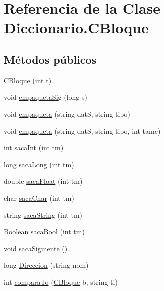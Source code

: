 \hypertarget{class_diccionario_1_1_c_bloque}{\section{Referencia de la Clase Diccionario.\-C\-Bloque}
\label{class_diccionario_1_1_c_bloque}
}
\subsection*{Métodos públicos}
\begin{DoxyCompactItemize}
\item 
\hyperlink{class_diccionario_1_1_c_bloque_a38a4b7e9ac45c68a4f856c910460f60b}{C\-Bloque} (int t)
\item 
void \hyperlink{class_diccionario_1_1_c_bloque_aa1a4c1a908e3145c81f0d39a864a1a2a}{empaqueta\-Sig} (long s)
\item 
void \hyperlink{class_diccionario_1_1_c_bloque_a74309dc130ed48a37b84290667936914}{empaqueta} (string dat\-S, string tipo)
\item 
void \hyperlink{class_diccionario_1_1_c_bloque_a71e65edd630045806410020be0f1ded5}{empaqueta} (string dat\-S, string tipo, int tamc)
\item 
int \hyperlink{class_diccionario_1_1_c_bloque_a6ab751791d1a51d9f23609ba0dff6bed}{saca\-Int} (int tm)
\item 
long \hyperlink{class_diccionario_1_1_c_bloque_a51f661dfa3b51a9fdb99bcc30d20b31f}{saca\-Long} (int tm)
\item 
double \hyperlink{class_diccionario_1_1_c_bloque_acc34db5bd74201fc189f399897f1c3d6}{saca\-Float} (int tm)
\item 
char \hyperlink{class_diccionario_1_1_c_bloque_a426a73979bad4996de63f1c1917f3640}{saca\-Char} (int tm)
\item 
string \hyperlink{class_diccionario_1_1_c_bloque_a4f6eaa07ae1e4f3227551f9cbfad309f}{saca\-String} (int tm)
\item 
Boolean \hyperlink{class_diccionario_1_1_c_bloque_a79018a44614fc89e3c74ebd2b199e985}{saca\-Bool} (int tm)
\item 
void \hyperlink{class_diccionario_1_1_c_bloque_a5161c1a794e7c7642e2f44a45f3597b6}{saca\-Siguiente} ()
\item 
long \hyperlink{class_diccionario_1_1_c_bloque_aa2371ecd883f48d1749cf4ff90b73d05}{Direccion} (string nom)
\item 
int \hyperlink{class_diccionario_1_1_c_bloque_a906d2972176ce52e12b8b4cfb7843e2b}{compara\-To} (\hyperlink{class_diccionario_1_1_c_bloque}{C\-Bloque} b, string ti)
\end{DoxyCompactItemize}
